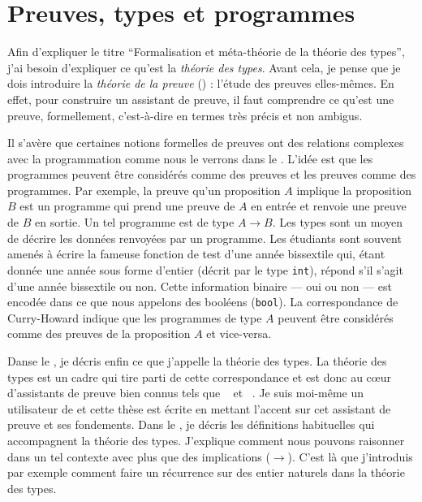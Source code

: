 \section{Preuves, types et programmes}

Afin d'expliquer le titre ``Formalisation et méta-théorie de la théorie des
types'', j'ai besoin d'expliquer ce qu'est la \emph{théorie des types}.
Avant cela, je pense que je dois introduire la \emph{théorie de la preuve}
() : l'étude des preuves elles-mêmes.
En effet, pour construire un assistant de preuve, il faut comprendre ce qu'est
une preuve, formellement, c'est-à-dire en termes très précis et non ambigus.

Il s'avère que certaines notions formelles de preuves ont des relations complexes avec la programmation comme nous le verrons dans le .
L'idée est que les programmes peuvent être considérés comme des preuves et les
preuves comme des programmes.
Par exemple, la preuve qu'un proposition \(A\) implique la proposition \(B\)
est un programme qui prend une preuve de \(A\) en entrée et renvoie une preuve
de \(B\) en sortie.
Un tel programme est de type \(A \to B\). Les types sont un moyen de décrire les
données renvoyées par un programme. Les étudiants sont souvent amenés à écrire
la fameuse fonction de test d'une année bissextile qui, étant donnée une année
sous forme d'entier (décrit par le type \texttt{int}), répond s'il
s'agit d'une année bissextile ou non. Cette information binaire --- oui ou non
--- est encodée dans ce que nous appelons des booléens
(\texttt{bool}).
La correspondance de Curry-Howard indique que les programmes de type \(A\)
peuvent être considérés comme des preuves de la proposition \(A\) et vice-versa.

Danse le , je décris enfin ce que j'appelle la théorie
des types.
La théorie des types est un cadre qui tire parti de cette correspondance et est donc au cœur d'assistants de preuve bien connus tels que
\Coq~ et \Agda~.
Je suis moi-même un utilisateur de \Coq et cette thèse est écrite en mettant
l'accent sur cet assistant de preuve et ses fondements.
Dans le , je décris les définitions habituelles qui
accompagnent la théorie des types.
J'explique comment nous pouvons raisonner dans un tel contexte avec plus que des
implications (\(\to\)).
%
C'est là que j'introduis par exemple comment faire un récurrence sur des entier
naturels dans la théorie des types.

